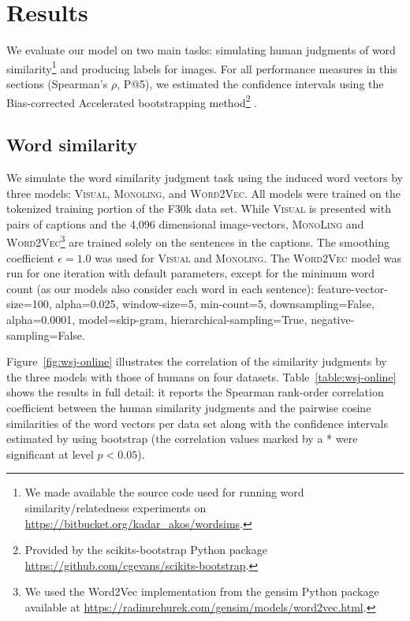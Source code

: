 \section{Results}
\label{sec:results_intro}
We evaluate our model on two main tasks: simulating human judgments of
word similarity\footnote{We made available the source code used for running word similarity/relatedness
experiments on \url{https://bitbucket.org/kadar_akos/wordsims}.} and producing labels for images. For all performance measures in this sections (Spearman's $\rho$, P@5), we estimated the confidence intervals
using the Bias-corrected Accelerated bootstrapping method\footnote{
Provided by the scikits-bootstrap Python package \url{https://github.com/cgevans/scikits-bootstrap}.}
\cite{efron1982jackknife}.

\subsection{Word similarity}
\label{sec:res_wordsim}

We simulate the word similarity judgment task using the induced word
vectors by three models: \textsc{Visual}, \textsc{Monoling}, and
\textsc{Word2Vec}. All models were trained on the tokenized training
portion of the F30k data set. While \textsc{Visual} is presented
with pairs of captions and the 4,096 dimensional image-vectors,
\textsc{MonoLing} and \label{rev:word2vec}\textsc{Word2Vec}\footnote{We used the Word2Vec implementation from the
gensim Python package available at \url{https://radimrehurek.com/gensim/models/word2vec.html}.
} are trained solely on the sentences in the captions. The smoothing coefficient $\epsilon=1.0$ was used for
\textsc{Visual} and \textsc{Monoling}. The \textsc{Word2Vec} model was
run for one iteration with default parameters, except for the minimum
word count (as our models also consider each word in each sentence):
{\footnotesize feature-vector-size=100, alpha=0.025, window-size=5,
  min-count=5, downsampling=False, alpha=0.0001, model=skip-gram,
  hierarchical-sampling=True, negative-sampling=False}.


Figure~\ref{fig:wsj-online} illustrates the correlation of the similarity
judgments by the three models with those of humans on four
datasets. Table~\ref{table:wsj-online} shows the results in full detail:
it reports the Spearman rank-order correlation coefficient between the
human similarity judgments and the pairwise cosine similarities of the
word vectors per data set along with the confidence intervals
estimated by using bootstrap (the correlation values marked by a * were
significant at level $p<0.05$).\label{rev:wordsim_details}

